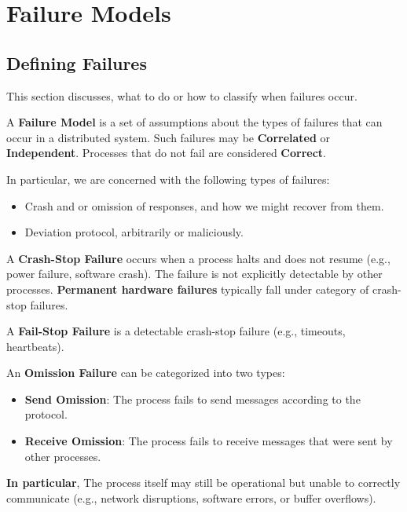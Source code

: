\newpage 
\section{Failure Models}

\label{sec:failures}
\subsection{Defining Failures}
This section discusses, what to do or how to classify when failures occur.

\begin{Def}

    A \textbf{Failure Model} is a set of assumptions about the types of failures that can occur in a distributed system.
    Such failures may be \textbf{Correlated} or \textbf{Independent}. Processes that do not fail are considered \textbf{Correct}.
\end{Def}

\noindent
In particular, we are concerned with the following types of failures:
\begin{itemize}
    \item Crash and or omission of responses, and how we might recover from them.
    \item Deviation protocol, arbitrarily or maliciously.
\end{itemize}
\begin{Def}
    
    \label{def:crash-stop}
    A \textbf{Crash-Stop Failure} occurs when a process halts and does not resume (e.g., power failure, software crash). The failure is not explicitly detectable by other processes.
    \textbf{Permanent hardware failures} typically fall under category of crash-stop failures.\\
\end{Def}

\noindent

\begin{Def}
    
    A \textbf{Fail-Stop Failure} is a detectable crash-stop failure (e.g., timeouts, heartbeats).
\end{Def}


\begin{Def}

    An \textbf{Omission Failure} can be categorized into two types:

    \begin{itemize}
        \item \textbf{Send Omission}: The process fails to send messages according to the protocol.
        \item \textbf{Receive Omission}: The process fails to receive messages that were sent by other processes.
    \end{itemize}

    \noindent
    \textbf{In particular}, The process itself may still be operational but unable to correctly communicate (e.g., network disruptions, software errors, or buffer overflows).
\end{Def}


